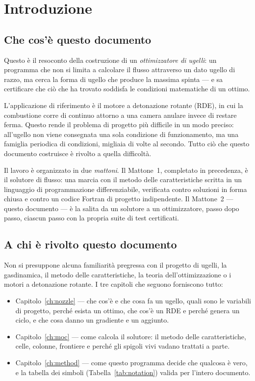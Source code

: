 \chapter{Introduzione}
\label{ch:intro}

\section{Che cos'è questo documento}

Questo è il resoconto della costruzione di un \emph{ottimizzatore di
ugelli}: un programma che non si limita a calcolare il flusso
attraverso un dato ugello di razzo, ma cerca la forma di ugello che
produce la massima spinta --- e sa certificare che ciò che ha
trovato soddisfa le condizioni matematiche di un ottimo.

L'applicazione di riferimento è il motore a detonazione rotante
(RDE), in cui la combustione corre di continuo attorno a una camera
anulare invece di restare ferma. Questo rende il problema di
progetto più difficile in un modo preciso: all'ugello non viene
consegnata una sola condizione di funzionamento, ma una famiglia
periodica di condizioni, migliaia di volte al secondo. Tutto ciò che
questo documento costruisce è rivolto a quella difficoltà.

Il lavoro è organizzato in due \emph{mattoni}. Il Mattone~1,
completato in precedenza, è il solutore di flusso: una marcia con il
metodo delle caratteristiche scritta in un linguaggio di
programmazione differenziabile, verificata contro soluzioni in forma
chiusa e contro un codice Fortran di progetto indipendente. Il
Mattone~2 --- questo documento --- è la salita da un solutore a un
ottimizzatore, passo dopo passo, ciascun passo con la propria suite
di test certificati.

\section{A chi è rivolto questo documento}

Non si presuppone alcuna familiarità pregressa con il progetto di
ugelli, la gasdinamica, il metodo delle caratteristiche, la teoria
dell'ottimizzazione o i motori a detonazione rotante. I tre capitoli
che seguono forniscono tutto:

\begin{itemize}[itemsep=2pt]
\item Capitolo~\ref{ch:nozzle} --- che cos'è e che cosa fa un
  ugello, quali sono le variabili di progetto, perché esista un
  ottimo, che cos'è un RDE e perché genera un ciclo, e che cosa
  danno un gradiente e un aggiunto.
\item Capitolo~\ref{ch:moc} --- come calcola il solutore: il metodo
  delle caratteristiche, celle, colonne, frontiere e perché gli
  spigoli vivi vadano trattati a parte.
\item Capitolo~\ref{ch:method} --- come questo programma decide che
  qualcosa è vero, e la tabella dei simboli
  (Tabella~\ref{tab:notation}) valida per l'intero documento.
\end{itemize}

